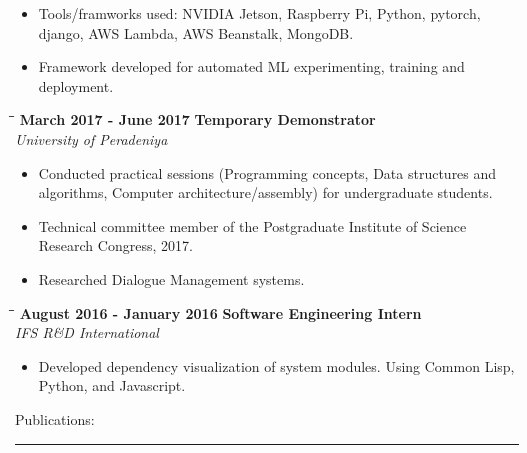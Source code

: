 \documentclass[a4paper,10pt]{article}
\begin{document}
{\begin{minipage}[t]{0.60\textwidth}
\begin{itemize}
\begin{itemize}
        \setlength\itemsep{-0.1pt}
      \item Tools/framworks used: NVIDIA Jetson, Raspberry Pi, Python, pytorch, django, AWS Lambda, AWS Beanstalk, MongoDB.
      \item Framework developed for automated ML experimenting, training and deployment.
      \end{itemize}
    \end{itemize}
    \begin{tabbing}
      \=\hspace*{6cm}\=\hspace*{5cm}\= \kill
      \>\textbf{ March 2017 - June 2017} \> \textbf{Temporary Demonstrator}\\\>\> \emph{University of Peradeniya}
    \end{tabbing}
    \vspace{-0.5cm}
    \begin{itemize}
      \setlength\itemsep{-0.1pt}
    \item Conducted practical sessions (Programming concepts, Data structures and algorithms, Computer architecture/assembly) for undergraduate students. %
    \item Technical committee member of the Postgraduate Institute of Science Research Congress, 2017.
    \item Researched Dialogue Management systems.
    \end{itemize}
    \begin{tabbing}
      \=\hspace*{6cm}\=\hspace*{5cm}\= \kill
      \>\textbf{ August 2016 - January 2016} \> \textbf{Software Engineering Intern}\\\>\> \emph{IFS R\&D International}
    \end{tabbing}
    \vspace{-0.5cm}
    \begin{itemize}
      \setlength\itemsep{-0.1pt}
    \item Developed dependency visualization of system modules. Using Common Lisp, Python, and Javascript.
    \end{itemize}
    \vspace{0.5cm}
    {\large Publications:}\vspace{-0.2cm}\\
    \rule{0.75\textwidth}{0.4pt}
    \vspace{0.1cm}\\

\end{minipage}}
\end{document}
